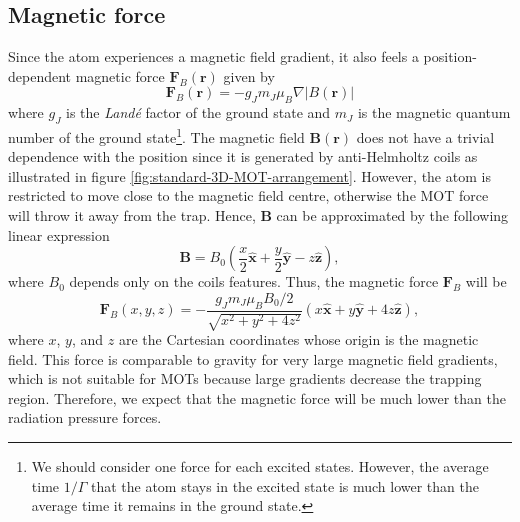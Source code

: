 \subsection{Magnetic force}
\label{sec:magnetic-force}

Since the atom experiences a magnetic field gradient, it also feels a position-dependent magnetic force $ \mathbf{F}_B(\mathbf{r}) $ \cite[Section~3.2.1]{courteille2019atom} given by
\begin{equation}
	\mathbf{F}_B(\mathbf{\mathbf{r}}) = - g_J m_J \mu_B \nabla |B(\mathbf{r})|
\end{equation}
where $g_J$ is the \textit{Landé} factor of the ground state and $ m_J $ is the magnetic quantum number of the ground state\footnote{We should consider one force for each excited states. However, the average time $ 1/\Gamma $ that the atom stays in the excited state is much lower than the average time it remains in the ground state.}. The magnetic field $ \mathbf{B}(\mathbf{r}) $ does not have a trivial dependence with the position since it is generated by anti-Helmholtz coils as illustrated in figure \ref{fig:standard-3D-MOT-arrangement}. However, the atom is restricted to move close to the magnetic field centre, otherwise the MOT force will throw it away from the trap. Hence, $ \mathbf{B} $ can be approximated by the following linear expression
\begin{equation}
	\mathbf{B} = B_0 \left(\frac{x}{2} \mathbf{\hat{x}} + \frac{y}{2} \mathbf{\hat{y}} - z \mathbf{\hat{z}} \right),
	\label{eq:magnetic-field-profile}
\end{equation}
where $ B_0 $ depends only on the coils features. Thus, the magnetic force $ \mathbf{F}_B $ will be
\begin{equation}
	\mathbf{F}_B(x, y, z) = - \frac{g_J m_J \mu_B B_0 / 2}{\sqrt{x^2 + y^2 + 4z^2}} \left( x \mathbf{\hat{x}} + y \mathbf{\hat{y}} + 4z \mathbf{\hat{z}} \right),
	\label{eq:magnetic-force-close-to-quadrupole-magnetic-fields-centre}
\end{equation}
where $ x $, $ y $, and $ z $ are the Cartesian coordinates whose origin is the magnetic field. This force is comparable to gravity for very large magnetic field gradients, which is not suitable for MOTs because large gradients decrease the trapping region. Therefore, we expect that the magnetic force will be much lower than the radiation pressure forces.
